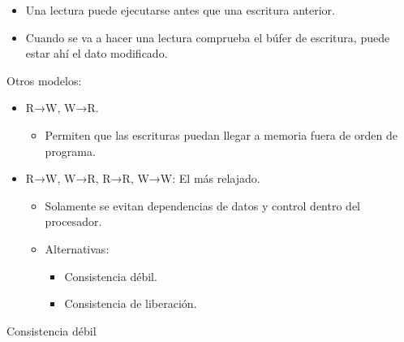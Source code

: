 \documentclass[12pt, twoside, openright]{report} %
\begin{document}
\begin{itemize}

	\item Una lectura puede ejecutarse antes que una escritura anterior.
	\item Cuando se va a hacer una lectura comprueba el búfer de
	      escritura, puede estar ahí el dato modificado.
\end{itemize}

Otros modelos:

\begin{itemize}

	\item R→W, W→R.

	      \begin{itemize}

		      \item Permiten que las escrituras puedan llegar a memoria fuera de
		            orden de programa.
	      \end{itemize}
	\item R→W, W→R, R→R, W→W: El más relajado.

	      \begin{itemize}

		      \item Solamente se evitan dependencias de datos y control dentro del
		            procesador.
		      \item Alternativas:

		            \begin{itemize}

			            \item Consistencia débil.
			            \item Consistencia de liberación.
		            \end{itemize}
	      \end{itemize}
\end{itemize}

Consistencia débil
\end{document}
